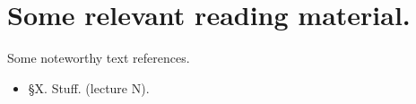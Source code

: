 \chapter{Some relevant reading material.}

Some noteworthy text references.

\begin{itemize}
\item \cite{XXX} \S X.  Stuff. (lecture N).
\end{itemize}

